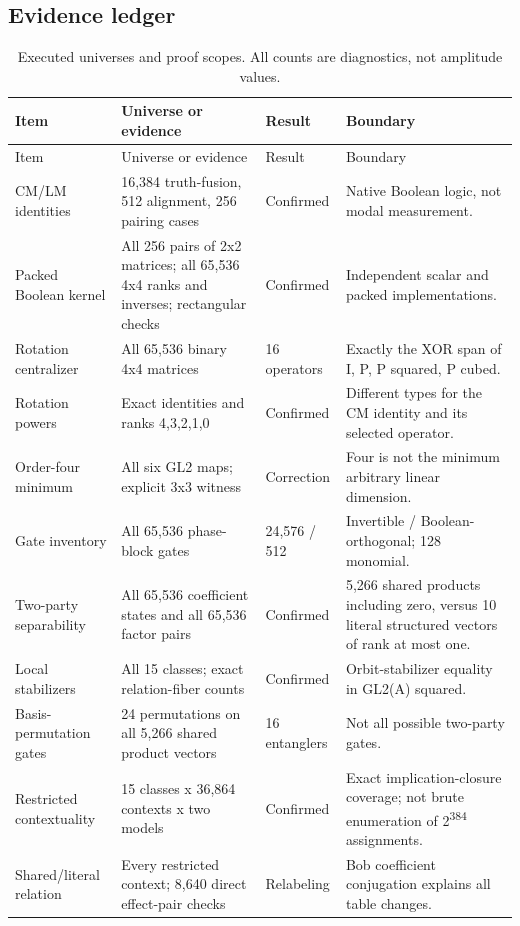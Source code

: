 \subsection{Evidence ledger}
\small
\begin{longtable}{@{}L{29mm}L{53mm}L{21mm}L{45mm}@{}}
\caption{Executed universes and proof scopes. All counts are diagnostics, not amplitude values.}\\
\toprule Item & Universe or evidence & Result & Boundary\\\midrule\endfirsthead
\toprule Item & Universe or evidence & Result & Boundary\\\midrule\endhead
CM/LM identities & 16,384 truth-fusion, 512 alignment, 256 pairing cases & Confirmed & Native Boolean logic, not modal measurement.\\
Packed Boolean kernel & All 256 pairs of 2x2 matrices; all 65,536 4x4 ranks and inverses; rectangular checks & Confirmed & Independent scalar and packed implementations.\\
Rotation centralizer & All 65,536 binary 4x4 matrices & 16 operators & Exactly the XOR span of I, P, P squared, P cubed.\\
Rotation powers & Exact identities and ranks 4,3,2,1,0 & Confirmed & Different types for the CM identity and its selected operator.\\
Order-four minimum & All six GL2 maps; explicit 3x3 witness & Correction & Four is not the minimum arbitrary linear dimension.\\
Gate inventory & All 65,536 phase-block gates & 24,576 / 512 & Invertible / Boolean-orthogonal; 128 monomial.\\
Two-party separability & All 65,536 coefficient states and all 65,536 factor pairs & Confirmed & 5,266 shared products including zero, versus 10 literal structured vectors of rank at most one.\\
Local stabilizers & All 15 classes; exact relation-fiber counts & Confirmed & Orbit-stabilizer equality in GL2(A) squared.\\
Basis-permutation gates & 24 permutations on all 5,266 shared product vectors & 16 entanglers & Not all possible two-party gates.\\
Restricted contextuality & 15 classes x 36,864 contexts x two models & Confirmed & Exact implication-closure coverage; not brute enumeration of 2\textsuperscript{384} assignments.\\
Shared/literal relation & Every restricted context; 8,640 direct effect-pair checks & Relabeling & Bob coefficient conjugation explains all table changes.\\

\end{longtable}
